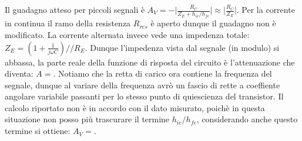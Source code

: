\documentclass[10pt,a4paper]{article}
\begin{document}
Il guadagno atteso per piccoli segnali è $A_V=-\vert \frac{R_C}{Z_E+h_{ie}/h_{fe}} \vert \approx \vert \frac{R_C}{Z_E} \vert$. 
Per la corrente in continua il ramo della resistenza $R_{res}$ è aperto dunque il guadagno non è modificato. La corrente alternata invece vede una impedenza totale: $Z_{E} = (1+\frac{1}{j \omega C})//R_{E}$. Dunque l'impedenza vista dal segnale (in modulo) si abbassa, la parte reale della funzione di risposta del circuito è l'attenuazione che diventa: $A = $. Notiamo che la retta di carico ora contiene la frequenza del segnale, dunque al variare della frequenza avrò un fascio di rette a coeffiente angolare variabile passanti per lo stesso punto di quiescienza del transistor.
Il calcolo riportato non è in accordo con il dato misurato, poichè in questa situazione non posso più trascurare il termine $h_{ie}/h_{fe}$, considerando anche questo termine si ottiene: $A_V = $.
\end{document}
